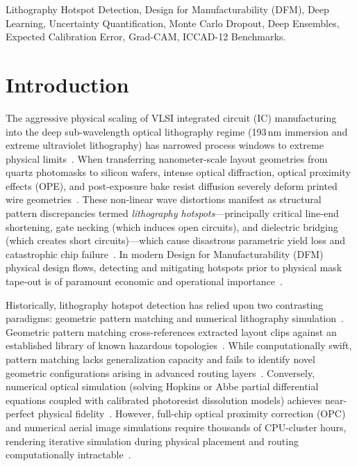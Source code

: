 \documentclass[conference]{IEEEtran}
\begin{document}
\begin{IEEEkeywords}
Lithography Hotspot Detection, Design for Manufacturability (DFM), Deep Learning, Uncertainty Quantification, Monte Carlo Dropout, Deep Ensembles, Expected Calibration Error, Grad-CAM, ICCAD-12 Benchmarks.
\end{IEEEkeywords}

\section{Introduction}
The aggressive physical scaling of VLSI integrated circuit (IC) manufacturing into the deep sub-wavelength optical lithography regime (193\,nm immersion and extreme ultraviolet lithography) has narrowed process windows to extreme physical limits~\cite{wong2001resolution, mack2007fundamental}. When transferring nanometer-scale layout geometries from quartz photomasks to silicon wafers, intense optical diffraction, optical proximity effects (OPE), and post-exposure bake resist diffusion severely deform printed wire geometries~\cite{dai2006optical, liebmann2003layout}. These non-linear wave distortions manifest as structural pattern discrepancies termed \textit{lithography hotspots}---principally critical line-end shortening, gate necking (which induces open circuits), and dielectric bridging (which creates short circuits)---which cause disastrous parametric yield loss and catastrophic chip failure~\cite{yu2018dfm, gao2014lithography}. In modern Design for Manufacturability (DFM) physical design flows, detecting and mitigating hotspots prior to physical mask tape-out is of paramount economic and operational importance~\cite{mitra2009accurate}.

Historically, lithography hotspot detection has relied upon two contrasting paradigms: geometric pattern matching and numerical lithography simulation~\cite{gupta2006accurate, lucas2010pattern}. Geometric pattern matching cross-references extracted layout clips against an established library of known hazardous topologies~\cite{matsunawa2015optical}. While computationally swift, pattern matching lacks generalization capacity and fails to identify novel geometric configurations arising in advanced routing layers~\cite{lucas2010pattern}. Conversely, numerical optical simulation (solving Hopkins or Abbe partial differential equations coupled with calibrated photoresist dissolution models) achieves near-perfect physical fidelity~\cite{brunner2011why, cobb1995fast}. However, full-chip optical proximity correction (OPC) and numerical aerial image simulations require thousands of CPU-cluster hours, rendering iterative simulation during physical placement and routing computationally intractable~\cite{yu2007fast, smayling2012lithography}.
\end{document}
